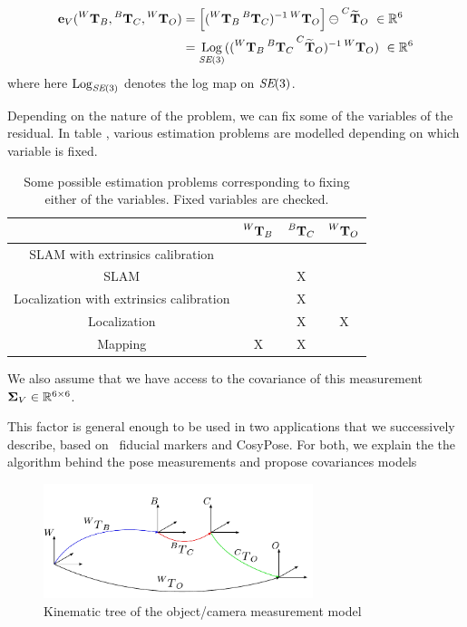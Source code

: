\begin{align}
    {\bf e}_V (\prescript{W}{}{{\bf T}}_{B}, \prescript{B}{}{{\bf T}}_{C}, \prescript{W}{}{{\bf T}}_{O}) 
    &= \left[ (\prescript{W}{}{{\bf T}}_{B}\prescript{B}{}{{\bf T}}_{C})^{-1}\prescript{W}{}{{\bf T}}_{O} \right] \ominus \prescript{C}{}{\widetilde{{\bf T}}}_{O} ~ \in \mathbb{R}^6 \\
    &= \operatorname*{Log}_{\textit{SE}(3)} ( (\prescript{W}{}{{\bf T}}_{B} \prescript{B}{}{{\bf T}}_{C} \prescript{C}{}{\widetilde{{\bf T}}}_{O})^{-1} \prescript{W}{}{{\bf T}}_{O}) ~ \in \mathbb{R}^6
\end{align}
%
where here $\operatorname*{Log}_{\textit{SE}(3)}$ denotes the log map on $\textit{SE}(3)$.

Depending on the nature of the problem, we can fix some of the variables of the residual. In table , various estimation problems are modelled depending on which variable is fixed.

\begin{table}[h]
    \centering
    \begin{tabular}{|c|c|c|c|}
        \hline
        & $\prescript{W}{}{{\bf T}}_{B}$ & $\prescript{B}{}{{\bf T}}_{C}$ & $\prescript{W}{}{{\bf T}}_{O}$  \\
        \hline
        SLAM with extrinsics calibration & & & \\
        \hline
        SLAM & & X & \\
        \hline
        Localization with extrinsics calibration & & X & \\
        \hline
        Localization &  & X & X \\
        \hline
        Mapping & X & X &  \\
        \hline
    \end{tabular}
    \caption{Some possible estimation problems corresponding to fixing either of the variables. Fixed variables are checked.}
    \label{tab:res_var_fix}
\end{table}



We also assume that we have access to the covariance of this measurement 
\mbox{${\bm \Sigma}_V \in \mathbb{R}^{6 \times 6}$}. 

This factor is general enough to be used in two applications that we successively describe, based on \apriltag\ fiducial markers and CosyPose. For both, we explain the
the algorithm behind the pose measurements and propose covariances models


\begin{figure}
    \centering
    \includegraphics[width=0.7\textwidth]{figures/kin_tree_object.pdf}
    \caption{Kinematic tree of the object/camera measurement model}
    \label{fig:camera_object_chain}
\end{figure}


